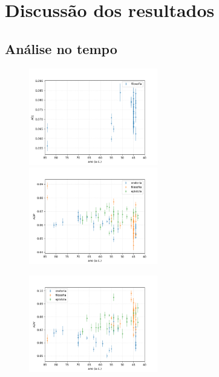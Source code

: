 \documentclass[10pt,a4paper,onecolumn]{article}
\theoremstyle{definition}
\theoremstyle{remark}
\begin{document}
\section{Discussão dos resultados}\label{sec:discussao}
\subsection{Análise no tempo}
\begin{figure}[htpb!]
	\centering
	\begin{multicols}{2}
		\includegraphics[width=0.5\textwidth]{graficos/ADJ_no_tempo.png}  \\
		\includegraphics[width=0.5\textwidth]{graficos/ADP_no_tempo.png}  \\
	\end{multicols}\vspace{-0.75cm}
	\begin{multicols}{2}
		\includegraphics[width=0.5\textwidth]{graficos/ADV_no_tempo.png}  \\

\end{multicols}
\end{figure}
\end{document}
